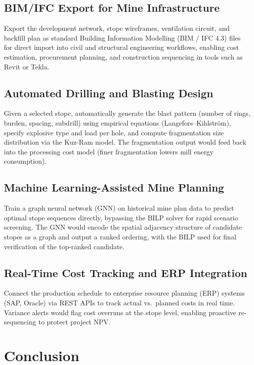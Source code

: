 \documentclass[12pt,a4paper]{article}
\begin{document}
\subsection{BIM/IFC Export for Mine Infrastructure}
Export the development network, stope wireframes, ventilation circuit, and backfill plan as standard Building Information Modelling (BIM / IFC 4.3) files for direct import into civil and structural engineering workflows, enabling cost estimation, procurement planning, and construction sequencing in tools such as Revit or Tekla.

\subsection{Automated Drilling and Blasting Design}
Given a selected stope, automatically generate the blast pattern (number of rings, burden, spacing, subdrill) using empirical equations (Langefors--Kihlström), specify explosive type and load per hole, and compute fragmentation size distribution via the Kuz-Ram model. The fragmentation output would feed back into the processing cost model (finer fragmentation lowers mill energy consumption).

\subsection{Machine Learning-Assisted Mine Planning}
Train a graph neural network (GNN) on historical mine plan data to predict optimal stope sequences directly, bypassing the BILP solver for rapid scenario screening. The GNN would encode the spatial adjacency structure of candidate stopes as a graph and output a ranked ordering, with the BILP used for final verification of the top-ranked candidate.

\subsection{Real-Time Cost Tracking and ERP Integration}
Connect the production schedule to enterprise resource planning (ERP) systems (SAP, Oracle) via REST APIs to track actual vs.\ planned costs in real time. Variance alerts would flag cost overruns at the stope level, enabling proactive re-sequencing to protect project NPV.

\section{Conclusion}
\label{sec:conclusion}
\end{document}
